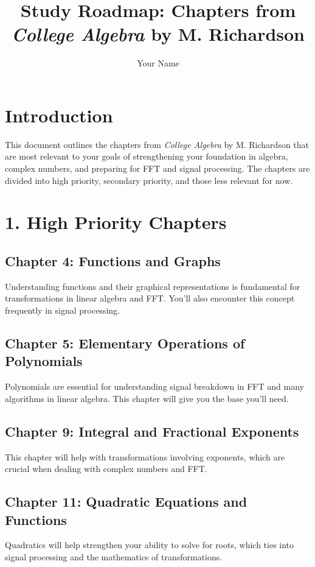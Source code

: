\documentclass{article}
\title{Study Roadmap: Chapters from \textit{College Algebra} by M. Richardson}
\author{Your Name}
\date{}
\begin{document}
\maketitle

\section*{Introduction}
This document outlines the chapters from \textit{College Algebra} by M. Richardson that are most relevant to your goals of strengthening your foundation in algebra, complex numbers, and preparing for FFT and signal processing. The chapters are divided into high priority, secondary priority, and those less relevant for now.

\section*{1. High Priority Chapters}

\subsection*{Chapter 4: Functions and Graphs}
Understanding functions and their graphical representations is fundamental for transformations in linear algebra and FFT. You’ll also encounter this concept frequently in signal processing.

\subsection*{Chapter 5: Elementary Operations of Polynomials}
Polynomials are essential for understanding signal breakdown in FFT and many algorithms in linear algebra. This chapter will give you the base you'll need.

\subsection*{Chapter 9: Integral and Fractional Exponents}
This chapter will help with transformations involving exponents, which are crucial when dealing with complex numbers and FFT.

\subsection*{Chapter 11: Quadratic Equations and Functions}
Quadratics will help strengthen your ability to solve for roots, which ties into signal processing and the mathematics of transformations.
\end{document}
